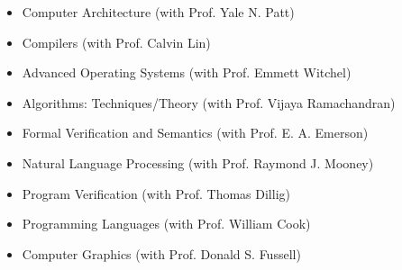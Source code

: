 \documentclass[margin, 9pt]{res} %
\begin{document}
\begin{resume}
\vspace*{-2pt}
\begin{itemize}[leftmargin=*] \itemsep -2pt
	\item Computer Architecture (with Prof. Yale N. Patt)
	\item Compilers (with Prof. Calvin Lin)
	\item Advanced Operating Systems (with Prof. Emmett Witchel)
	\item Algorithms: Techniques/Theory (with Prof. Vijaya Ramachandran)
	\item Formal Verification and Semantics (with Prof. E. A. Emerson)
	\item Natural Language Processing (with Prof. Raymond J. Mooney)
	\item Program Verification (with Prof. Thomas Dillig)
	\item Programming Languages (with Prof. William Cook)
	\item Computer Graphics (with Prof. Donald S. Fussell)
\end{itemize}


\end{resume}
\end{document}
